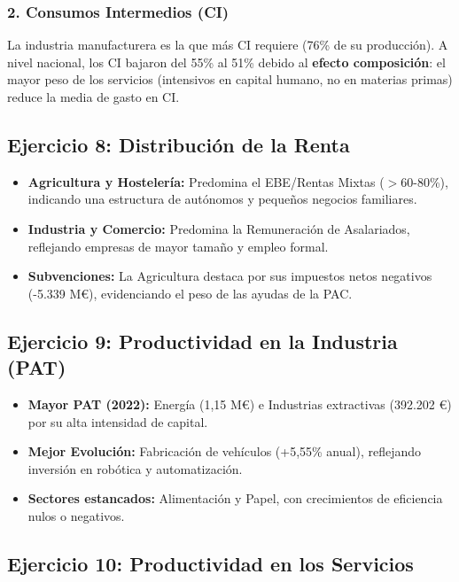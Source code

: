 \subsubsection{2. Consumos Intermedios (CI)}
La industria manufacturera es la que más CI requiere (76\% de su producción). A nivel nacional, los CI bajaron del 55\% al 51\% debido al \textbf{efecto composición}: el mayor peso de los servicios (intensivos en capital humano, no en materias primas) reduce la media de gasto en CI.

\subsection{Ejercicio 8: Distribución de la Renta}

\begin{itemize}
    \item \textbf{Agricultura y Hostelería:} Predomina el EBE/Rentas Mixtas ($>$60-80\%), indicando una estructura de autónomos y pequeños negocios familiares.
    \item \textbf{Industria y Comercio:} Predomina la Remuneración de Asalariados, reflejando empresas de mayor tamaño y empleo formal.
    \item \textbf{Subvenciones:} La Agricultura destaca por sus impuestos netos negativos (-5.339 M€), evidenciando el peso de las ayudas de la PAC.
\end{itemize}

\subsection{Ejercicio 9: Productividad en la Industria (PAT)}

\begin{itemize}
    \item \textbf{Mayor PAT (2022):} Energía (1,15 M€) e Industrias extractivas (392.202 €) por su alta intensidad de capital.
    \item \textbf{Mejor Evolución:} Fabricación de vehículos (+5,55\% anual), reflejando inversión en robótica y automatización.
    \item \textbf{Sectores estancados:} Alimentación y Papel, con crecimientos de eficiencia nulos o negativos.
\end{itemize}

\subsection{Ejercicio 10: Productividad en los Servicios}

